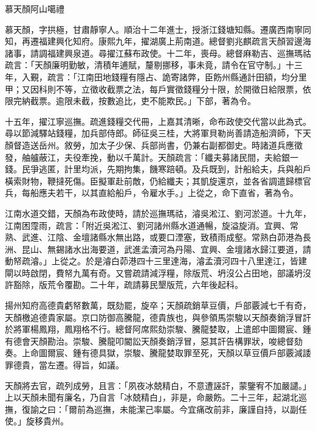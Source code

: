 
\begin{pinyinscope}
慕天顏阿山噶禮

慕天顏，字拱極，甘肅靜寧人。順治十二年進士，授浙江錢塘知縣。遷廣西南寧同知，再遷福建興化知府。康熙九年，擢湖廣上荊南道。總督劉兆麒疏言天顏習邊海諸事，請調福建興泉道。尋擢江蘇布政使。十二年，喪母。總督麻勒吉、巡撫瑪祜疏言：「天顏廉明勤敏，清積年逋賦，釐剔挪移，事未竟，請令在官守制。」十三年，入覲，疏言：「江南田地錢糧有隱占、詭寄諸弊，臣飭州縣通計田額，均分里甲；又因科則不等，立徵收截票之法，每戶實徵錢糧分十限，於開徵日給限票，依限完納截票。逾限未截，按數追比，吏不能欺民。」下部，著為令。

十五年，擢江寧巡撫。疏進錢糧交代冊，上嘉其清晰，命布政使交代當以此為式。尋以節減驛站錢糧，加兵部侍郎。師征吳三桂，大將軍貝勒尚善請造船濟師，下天顏督造送岳州。敘勞，加太子少保、兵部尚書，仍兼右副都御史。時諸道兵應徵發，舳艫蔽江，夫役牽挽，動以千萬計。天顏疏言：「纖夫募諸民間，夫給銀一錢。民爭逃匿，計里均派，先期拘集，饑寒踣頓。及兵既到，計船給夫，兵與船戶橫索財物，鞭撻死傷。臣擬軍赴前敵，仍給纖夫；其凱旋還京，並各省調遣歸標官兵，每船應夫若干，以其直給船戶，令雇水手。」上從之，命下直省，著為令。

江南水道交錯，天顏為布政使時，請於巡撫瑪祜，濬吳淞江、劉河淤道。十九年，江南困霪雨，疏言：「附近吳淞江、劉河諸州縣水道通暢，旋溢旋消。宜興、常熟、武進、江陰、金壇諸縣水無出路，或要口湮塞，致積雨成壑。常熟白茆港為長洲、昆山、無錫諸水出海要道，武進孟瀆河為丹陽、宜興、金壇諸水歸江要道，請動帑疏濬。」上從之。於是濬白茆港四十三里達海，濬孟瀆河四十八里達江，皆建閘以時啟閉，費帑九萬有奇。又嘗疏請減浮糧，除版荒、坍沒公占田地，部議坍沒許豁除，版荒令覆勘。二十年，疏請募民墾版荒，六年後起科。

揚州知府高德貴虧帑數萬，既劾罷，旋卒；天顏疏銷草豆價，戶部覈減七千有奇，天顏檄追德貴家屬。京口防御高騰龍，德貴族也，與參領馬崇駿以天顏奏銷浮冒訐於將軍楊鳳翔，鳳翔格不行。總督阿席熙劾崇駿、騰龍婪取，上遣郎中圖爾宸、鍾有德會天顏勘治。崇駿、騰龍叩閽訟天顏奏銷浮冒，惡其訐告構罪狀，唆總督劾奏。上命圖爾宸、鍾有德具獄，崇駿、騰龍婪取罪至死，天顏以草豆價戶部覈減諉罪德貴，當左遷。得旨，如議。

天顏將去官，疏列成勞，且言：「夙夜冰兢精白，不意遭誣訐，蒙鑒宥不加嚴譴。」上以天顏未聞有廉名，乃自言「冰兢精白」，非是，命嚴飭。二十三年，起湖北巡撫，復諭之曰：「爾前為巡撫，未能潔己率屬。今宜痛改前非，廉謹自持，以副任使。」旋移貴州。


\end{pinyinscope}
